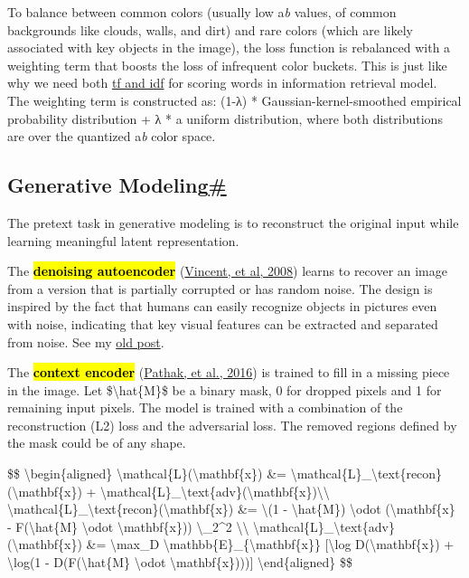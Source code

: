 To balance between common colors (usually low a\emph{b} values, of common backgrounds like clouds, walls, and dirt) and rare colors (which are likely associated with key objects in the image), the loss function is rebalanced with a weighting term that boosts the loss of infrequent color buckets. This is just like why we need both \href{https://en.wikipedia.org/wiki/Tf\%E2\%80\%93idf}{tf and idf} for scoring words in information retrieval model. The weighting term is constructed as: (1-λ) * Gaussian-kernel-smoothed empirical probability distribution + λ * a uniform distribution, where both distributions are over the quantized a\emph{b} color space.

\subsection{\texorpdfstring{Generative Modeling\hyperref[generative-modeling]{\#}}{Generative Modeling\#}}\label{generative-modeling}

The pretext task in generative modeling is to reconstruct the original input while learning meaningful latent representation.

The \hl{\textbf{denoising autoencoder}} (\href{https://www.cs.toronto.edu/~larocheh/publications/icml-2008-denoising-autoencoders.pdf}{Vincent, et al, 2008}) learns to recover an image from a version that is partially corrupted or has random noise. The design is inspired by the fact that humans can easily recognize objects in pictures even with noise, indicating that key visual features can be extracted and separated from noise. See my \href{https://lilianweng.github.io/posts/2018-08-12-vae/\#denoising-autoencoder}{old post}.

The \hl{\textbf{context encoder}} (\href{https://arxiv.org/abs/1604.07379}{Pathak, et al., 2016}) is trained to fill in a missing piece in the image. Let \$\textbackslash hat\{M\}\$ be a binary mask, 0 for dropped pixels and 1 for remaining input pixels. The model is trained with a combination of the reconstruction (L2) loss and the adversarial loss. The removed regions defined by the mask could be of any shape.

\$\$ \textbackslash begin\{aligned\} \textbackslash mathcal\{L\}(\textbackslash mathbf\{x\}) \&= \textbackslash mathcal\{L\}\_\textbackslash text\{recon\}(\textbackslash mathbf\{x\}) + \textbackslash mathcal\{L\}\_\textbackslash text\{adv\}(\textbackslash mathbf\{x\})\textbackslash\textbackslash{} \textbackslash mathcal\{L\}\_\textbackslash text\{recon\}(\textbackslash mathbf\{x\}) \&= \textbackslash\textbar(1 - \textbackslash hat\{M\}) \textbackslash odot (\textbackslash mathbf\{x\} - F(\textbackslash hat\{M\} \textbackslash odot \textbackslash mathbf\{x\})) \textbackslash\textbar\_2\^{}2 \textbackslash\textbackslash{} \textbackslash mathcal\{L\}\_\textbackslash text\{adv\}(\textbackslash mathbf\{x\}) \&= \textbackslash max\_D \textbackslash mathbb\{E\}\_\{\textbackslash mathbf\{x\}\} {[}\textbackslash log D(\textbackslash mathbf\{x\}) + \textbackslash log(1 - D(F(\textbackslash hat\{M\} \textbackslash odot \textbackslash mathbf\{x\}))){]} \textbackslash end\{aligned\} \$\$

